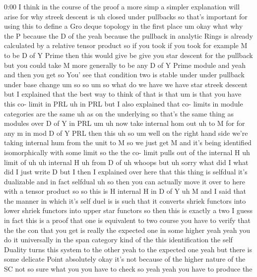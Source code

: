 \begin{unfinished}{0:00}
I  think  in  the  course  of  the  proof  a
more  simp  a  simpler  explanation  will
arise  for  why  streek  descent  is  uh
closed  under  pullbacks  so  that's
important  for  using  this  to  define  a  Gro
deque  topology  in  the  first
place
um  okay  what  why  the  P  because  the  D  of
the  yeah  because  the  pullback  in
analytic  Rings  is  already  calculated  by
a  relative  tensor  product  so  if  you  took
if  you  took  for  example  M  to  be  D  of  Y
Prime  then  this  would  give  be  give  you
star  descent  for  the  pullback  but  you
could  take  M  more  generally  to  be  any  D
of  Y  Prime  module
and  yeah  and  then  you  get  so  You'  see
that  condition  two  is  stable  under  under
pullback  under  base
change
um
so
so  um  so  what  do  we  have  we  have  star
streek  descent  but  I  explained  that  the
best  way  to  think  of  that  is  that
um  is  that  you  have  this  co-  limit  in
PRL
uh  in
PRL  but  I  also  explained  that  co-  limits
in  module  categories  are  the  same  uh  as
on  the  underlying  so  that's  the  same
thing  as  modules  over  D  of  Y  in
PRL
um  uh  now  take  internal  hom
out  uh  to  M  for  for  any  m  in  mod  D  of  Y
PRL  then  this
uh  so  um  well  on  the  right  hand  side
we're  taking  internal  hum  from  the  unit
to  M  so  we  just  get  M  and  it's  being
identified  isomorphically  with  some
limit  so  the  the  co-  limit  pulls  out  of
the  internal  H  uh  limit  of  uh  uh
internal
H  uh  from  D
of  uh
whoops  but  uh  sorry  what  did  I  what  did
I  just  write
D  but  I  then  I  explained  over  here  that
this  thing  is  selfdual  it's  dualizable
and  in  fact
selfdual  uh  so  then  you  can  actually
move  it  over  to  here  with  a  tensor
product
so  so  this  is  H  internal  H  in  D  of
Y  uh  M  and  I  said  that  the  manner  in
which  it's  self  duel  is  is  such  that  it
converts  shriek  functors  into  lower
shriek  functors  into  upper  star  functors
so  then  this  is  exactly
a
two  I  guess  in  fact  this  is  a  proof  that
one  is  equivalent  to  two
course  you  have  to  verify  that  the  the
con  that  you  get  is  really  the  expected
one  in  some  higher  yeah  yeah  you  do  it
universally  in  the  span  category  kind  of
the  this
identification  the  self  Duality  turns
this  system  to  the  other  yeah  to  the
expected  one  yeah  but  there  is  some
delicate  Point  absolutely  okay  it's  not
because  of  the  higher  nature  of  the  SC
not  so  sure  what  you  you  have  to  check
so  yeah  yeah  you  have  to  produce  the

\end{unfinished}
